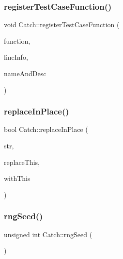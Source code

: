 \mbox{\label{namespace_catch_a220159aeff47f9c5231e893f2abbc643}} 
\subsubsection{\texorpdfstring{register\+Test\+Case\+Function()}{registerTestCaseFunction()}}
{\footnotesize\ttfamily void Catch\+::register\+Test\+Case\+Function (\begin{DoxyParamCaption}\item[{\hyperlink{namespace_catch_a26414f52d0835939fae52aadd27e6257}{Test\+Function}}]{function,  }\item[{\hyperlink{struct_catch_1_1_source_line_info}{Source\+Line\+Info} const \&}]{line\+Info,  }\item[{\hyperlink{struct_catch_1_1_name_and_desc}{Name\+And\+Desc} const \&}]{name\+And\+Desc }\end{DoxyParamCaption})}

\mbox{\label{namespace_catch_afe4e6770da547e43e9e4eeaa05f946ea}} 
\subsubsection{\texorpdfstring{replace\+In\+Place()}{replaceInPlace()}}
{\footnotesize\ttfamily bool Catch\+::replace\+In\+Place (\begin{DoxyParamCaption}\item[{\textbf{ std\+::string} \&}]{str,  }\item[{\textbf{ std\+::string} const \&}]{replace\+This,  }\item[{\textbf{ std\+::string} const \&}]{with\+This }\end{DoxyParamCaption})}

\mbox{\label{namespace_catch_acf5ea05e942d2d7fe79111e12754ed76}} 
\subsubsection{\texorpdfstring{rng\+Seed()}{rngSeed()}}
{\footnotesize\ttfamily unsigned int Catch\+::rng\+Seed (\begin{DoxyParamCaption}{ }\end{DoxyParamCaption})}


